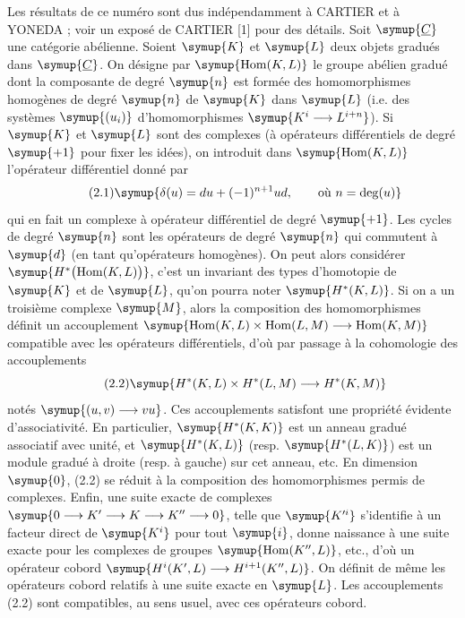 Les résultats de ce numéro sont dus indépendamment à CARTIER et à YONEDA ; voir
un exposé de CARTIER [1] pour des détails. Soit $\symup{\underline{C}}$ une catégorie abélienne.
Soient $\symup{K}$ et $\symup{L}$ deux objets gradués dans $\symup{\underline{C}}$. On désigne par
$\symup{\operatorname{Hom}(K,L)}$ le groupe abélien gradué dont la composante de degré
$\symup{n}$ est formée des homomorphismes homogènes de degré $\symup{n}$ de $\symup{K}$ dans $\symup{L}$ (i.e.
des systèmes $\symup{(u_i)}$ d'homomorphismes $\symup{K^{i}\longrightarrow L^{i+n}}$).
Si $\symup{K}$ et $\symup{L}$ sont des complexes (à opérateurs différentiels de degré $\symup{+1}$ pour
fixer les idées), on introduit dans $\symup{\operatorname{Hom}(K,L)}$ l'opérateur
différentiel donné par
\begin{equation}\tag{2.1}
  \symup{\delta(u)=du+(-1)^{n+1}ud,\qquad\text{où }n=\deg(u)}
\end{equation}
qui en fait un complexe à opérateur différentiel de degré $\symup{+1}$. Les cycles de
degré $\symup{n}$ sont les opérateurs de degré $\symup{n}$ qui commutent à $\symup{d}$ (en tant
qu'opérateurs homogènes). On peut alors considérer
$\symup{H^{*}\bigl(\operatorname{Hom}(K,L)\bigr)}$, c'est un invariant des types
d'homotopie de $\symup{K}$ et de $\symup{L}$, qu'on pourra noter $\symup{H^{*}(K,L)}$.
Si on a un troisième complexe $\symup{M}$, alors la composition des homomorphismes
définit un accouplement
$\symup{\operatorname{Hom}(K,L)\times\operatorname{Hom}(L,M)
\longrightarrow\operatorname{Hom}(K,M)}$ compatible avec les opérateurs différentiels, d'où par passage à la cohomologie
des accouplements
\begin{equation}\tag{2.2}
  \symup{H^{*}(K,L)\times H^{*}(L,M)\longrightarrow H^{*}(K,M)}
\end{equation}
notés $\symup{(u,v)\longrightarrow vu}$. Ces accouplements satisfont une propriété évidente
d'associativité. En particulier, $\symup{H^{*}(K,K)}$ est un anneau gradué associatif
avec unité, et $\symup{H^{*}(K,L)}$ (resp. $\symup{H^{*}(L,K)}$) est un module gradué à droite
(resp. à gauche) sur cet anneau, etc. En dimension $\symup{0}$, (2.2) se réduit à la
composition des homomorphismes permis de complexes. Enfin, une suite exacte de
complexes
$\symup{0\longrightarrow K'\longrightarrow K\longrightarrow K''\longrightarrow 0}$, telle que $\symup{K'^{i}}$ s'identifie à un facteur direct de $\symup{K^{i}}$ pour tout $\symup{i}$,
donne naissance à une suite exacte pour les complexes de groupes
$\symup{\operatorname{Hom}(K'',L)}$, etc., d'où un opérateur cobord
$\symup{H^{i}(K',L)\longrightarrow H^{i+1}(K'',L)}$.
On définit de même les opérateurs cobord relatifs à une suite exacte en $\symup{L}$. Les
accouplements (2.2) sont compatibles, au sens usuel, avec ces opérateurs cobord.

